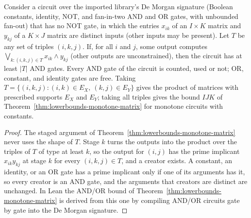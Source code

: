\begin{theorem}
  \label{thm:lowerbounds-monotone-partial-matrix}
  \leanok
  Consider a circuit over the imported library's De Morgan signature (Boolean
  constants, identity, NOT, and fan-in-two AND and OR gates, with unbounded
  fan-out) that has no NOT gate, in which the entries $x_{ik}$ of an
  $I \times K$ matrix and $y_{kj}$ of a $K \times J$ matrix are distinct inputs
  (other inputs may be present). Let $T$ be any set of triples $(i, k, j)$. If,
  for all $i$ and $j$, some output computes
  $\bigvee_{k : (i, k, j) \in T} x_{ik} \wedge y_{kj}$ (other outputs are
  unconstrained), then the circuit has at least $|T|$ AND gates. Every AND gate
  of the circuit is counted, used or not; OR, constant, and identity gates are
  free. Taking $T = \{(i, k, j) : (i, k) \in E_X,\ (k, j) \in E_Y\}$ gives the
  product of matrices with prescribed supports $E_X$ and $E_Y$; taking all
  triples gives the bound $IJK$ of
  Theorem~\ref{thm:lowerbounds-monotone-matrix} for monotone circuits with
  constants.
\end{theorem}
\begin{proof}
  \leanok
  The staged argument of Theorem~\ref{thm:lowerbounds-monotone-matrix} never
  uses the shape of $T$. Stage $k$ turns the outputs into the product over the
  triples of $T$ of type at least $k$, so the output for $(i, j)$ has the prime
  implicant $x_{ik} y_{kj}$ at stage $k$ for every $(i, k, j) \in T$, and a
  creator exists. A constant, an identity, or an OR gate has a prime implicant
  only if one of its arguments has it, so every creator is an AND gate, and the
  arguments that creators are distinct are unchanged. In Lean the AND/OR bound
  of Theorem~\ref{thm:lowerbounds-monotone-matrix} is derived from this one by
  compiling AND/OR circuits gate by gate into the De Morgan signature.
\end{proof}

